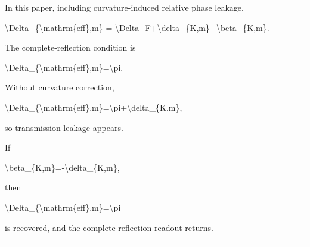 \documentclass[
  a4paper,
]{article}
\newenvironment{Shaded}{}{}
\newcommand{\NormalTok}[1]{#1}
\begin{document}
In this paper, including curvature-induced relative phase leakage,

\begin{Shaded}
\begin{Highlighting}[]
\NormalTok{\textbackslash{}Delta\_\{\textbackslash{}mathrm\{eff\},m\}}
\NormalTok{=}
\NormalTok{\textbackslash{}Delta\_F+\textbackslash{}delta\_\{K,m\}+\textbackslash{}beta\_\{K,m\}.}
\end{Highlighting}
\end{Shaded}

The complete-reflection condition is

\begin{Shaded}
\begin{Highlighting}[]
\NormalTok{\textbackslash{}Delta\_\{\textbackslash{}mathrm\{eff\},m\}=\textbackslash{}pi.}
\end{Highlighting}
\end{Shaded}

Without curvature correction,

\begin{Shaded}
\begin{Highlighting}[]
\NormalTok{\textbackslash{}Delta\_\{\textbackslash{}mathrm\{eff\},m\}=\textbackslash{}pi+\textbackslash{}delta\_\{K,m\},}
\end{Highlighting}
\end{Shaded}

so transmission leakage appears.

If

\begin{Shaded}
\begin{Highlighting}[]
\NormalTok{\textbackslash{}beta\_\{K,m\}={-}\textbackslash{}delta\_\{K,m\},}
\end{Highlighting}
\end{Shaded}

then

\begin{Shaded}
\begin{Highlighting}[]
\NormalTok{\textbackslash{}Delta\_\{\textbackslash{}mathrm\{eff\},m\}=\textbackslash{}pi}
\end{Highlighting}
\end{Shaded}

is recovered, and the complete-reflection readout returns.

\begin{center}\rule{0.5\linewidth}{0.5pt}\end{center}
\end{document}
